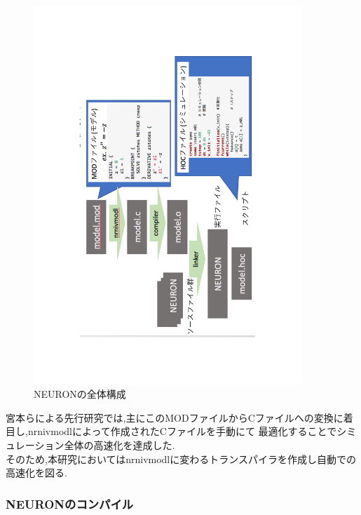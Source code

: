 \begin{figure}[htb]
  \begin{center}
    \includegraphics[width=0.9\textwidth, angle=-90]{./images/neuron}
    \caption{NEURONの全体構成}
    \label{fig:neuron}
  \end{center}
\end{figure}
\clearpage
宮本らによる先行研究\cite{miyamoto-master}では,主にこのMODファイルからCファイルへの変換に着目し,nrnivmodlによって作成されたCファイルを手動にて
最適化することでシミュレーション全体の高速化を達成した.\\
そのため,本研究においてはnrnivmodlに変わるトランスパイラを作成し自動での高速化を図る.\\

\subsubsection{NEURONのコンパイル}
